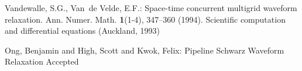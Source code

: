 \documentclass{svmult-ddm}
\begin{document}
\begin{thebibliography}{10}





Vandewalle, S.G., Van~de Velde, E.F.: Space-time concurrent multigrid waveform
  relaxation.
\newblock Ann. Numer. Math. \textbf{1}(1-4), 347--360 (1994).
\newblock Scientific computation and differential equations (Auckland, 1993)

Ong, Benjamin and High, Scott and Kwok, Felix: Pipeline Schwarz Waveform Relaxation
\newblock Accepted


\end{thebibliography}
\end{document}
